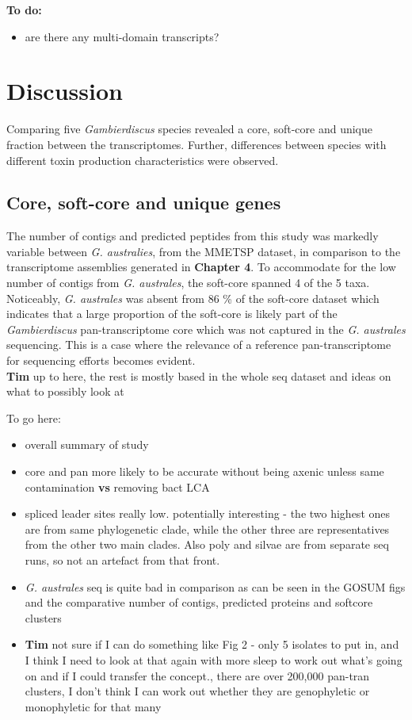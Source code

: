 \documentclass[12pt]{article}
\begin{document}
\textbf{To do:}
\begin{itemize}
\item are there any multi-domain  transcripts?
\end{itemize}

\section{Discussion}
Comparing five \textit{Gambierdiscus} species revealed a core, soft-core and unique fraction between the transcriptomes. 
Further, differences between species with different toxin production characteristics were observed.

\subsection{Core, soft-core and unique genes}
The number of contigs and predicted peptides from this study was markedly variable between \textit{G. australies}, from the MMETSP dataset, in comparison to the transcriptome assemblies generated in \textbf{Chapter 4}. 
To accommodate for the low number of contigs from \textit{G. australes}, the soft-core spanned 4 of the 5 taxa. 
Noticeably, \textit{G. australes} was absent from 86 \% of the soft-core dataset which indicates that a large proportion of the soft-core is likely part of the \textit{Gambierdiscus} pan-transcriptome core which was not captured in the \textit{G. australes} sequencing. 
This is a case where the relevance of a reference pan-transcriptome for sequencing efforts becomes evident.\\
\textbf{Tim} up to here, the rest is mostly based in the whole seq dataset and ideas on what to possibly look at

To go here:
\begin{itemize}
\item overall summary of study
\item core and pan more likely to be accurate without being axenic unless same contamination \textbf{vs} removing bact LCA
\item spliced leader sites really low. potentially interesting - the two highest ones are from same phylogenetic clade, while the other three are representatives from the other two main clades. Also poly and silvae are from separate seq runs, so not an artefact from that front.
\item \textit{G. australes} seq is quite bad in comparison as can be seen in the GOSUM figs and the comparative number of contigs, predicted proteins and softcore clusters
\item \textbf{Tim} not sure if I can do something like Fig 2 - only 5 isolates to put in, and I think I need to look at that again with more sleep to work out what's going on and if I could transfer the concept., there are over 200,000 pan-tran clusters, I don't think I can work out whether they are genophyletic or monophyletic for that many
\end{itemize}
\end{document}
